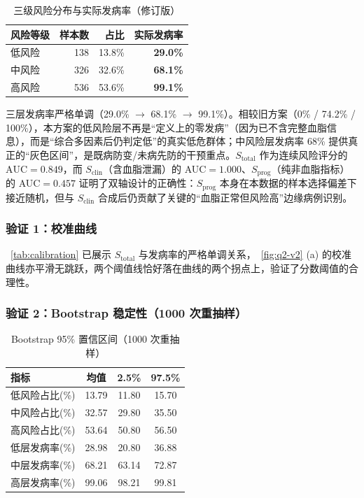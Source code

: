 \documentclass{MathorCupmodeling}
\begin{document}
\begin{table}[H]
\centering\small
\caption{三级风险分布与实际发病率（修订版）}\label{tab:q2-risk-new}
\begin{tabular}{@{}l r r r@{}}
\toprule
风险等级 & 样本数 & 占比 & 实际发病率 \\
\midrule
低风险 & 138 & 13.8\% & \textbf{29.0\%} \\
中风险 & 326 & 32.6\% & \textbf{68.1\%} \\
高风险 & 536 & 53.6\% & \textbf{99.1\%} \\
\bottomrule
\end{tabular}
\end{table}

三层发病率严格单调（29.0\% $\to$ 68.1\% $\to$ 99.1\%）。相较旧方案（0\% / 74.2\% / 100\%），本方案的低风险层不再是``定义上的零发病''（因为已不含完整血脂信息），而是``综合多因素后仍判定低''的真实低危群体；中风险层发病率 68\% 提供真正的``灰色区间''，是既病防变/未病先防的干预重点。$S_{\text{total}}$ 作为连续风险评分的 $\text{AUC}=0.849$，而 $S_{\text{clin}}$（含血脂泄漏）的 AUC$=1.000$、$S_{\text{prog}}$（纯非血脂指标）的 AUC$=0.457$ 证明了双轴设计的正确性：$S_{\text{prog}}$ 本身在本数据的样本选择偏差下接近随机，但与 $S_{\text{clin}}$ 合成后仍贡献了关键的``血脂正常但风险高''边缘病例识别。

\subsubsection{验证 1：校准曲线}

~\cref{tab:calibration} 已展示 $S_{\text{total}}$ 与发病率的严格单调关系，~\cref{fig:q2-v2} (a) 的校准曲线亦平滑无跳跃，两个阈值线恰好落在曲线的两个拐点上，验证了分数阈值的合理性。

\subsubsection{验证 2：Bootstrap 稳定性（1000 次重抽样）}

\begin{table}[H]
\centering\small
\caption{Bootstrap 95\% 置信区间（1000 次重抽样）}\label{tab:q2-boot}
\begin{tabular}{@{}l c c c@{}}
\toprule
指标 & 均值 & 2.5\% & 97.5\% \\
\midrule
低风险占比(\%) & 13.79 & 11.80 & 15.70 \\
中风险占比(\%) & 32.57 & 29.80 & 35.50 \\
高风险占比(\%) & 53.64 & 50.80 & 56.50 \\
低层发病率(\%) & 28.98 & 20.80 & 36.88 \\
中层发病率(\%) & 68.21 & 63.14 & 72.87 \\
高层发病率(\%) & 99.06 & 98.21 & 99.81 \\
\bottomrule
\end{tabular}
\end{table}
\end{document}
